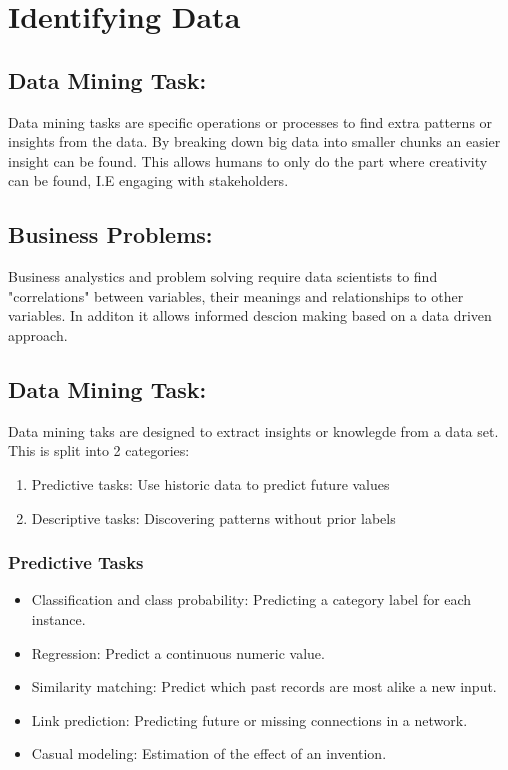 \documentclass[a5paper]{article}
\begin{document}
	\section{Identifying Data}
	\subsection{Data Mining Task:}
	Data mining tasks are specific operations or processes to find extra patterns or insights from the data. By breaking down big data into smaller chunks an easier insight can be found. This allows humans to only do the part where creativity can be found, I.E engaging with stakeholders.
	\subsection{Business Problems:}
	Business analystics and problem solving require data scientists to find "cor\-relations" between variables, their meanings and relationships to other variables. In additon it allows informed descion making based on a data driven approach.
	\subsection{Data Mining Task:}
	Data mining taks are designed to extract insights or knowlegde from a data set. This is split into 2 categories:
	\begin{enumerate}
		\item Predictive tasks: Use historic data to predict future values
		\item Descriptive tasks: Discovering patterns without prior labels
	\end{enumerate}
	\subsubsection{Predictive Tasks}
	\begin{itemize}
		\item Classification and class probability: Predicting a category label for each instance.
		\item Regression: Predict a continuous numeric value.
		\item Similarity matching: Predict which past records are most alike a new input.
		\item Link prediction: Predicting future or missing connections in a network.
		\item Casual modeling: Estimation of the effect of an invention.
	\end{itemize}
\end{document}
